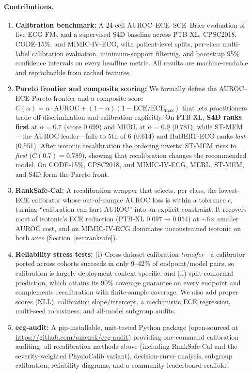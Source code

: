 \paragraph{Contributions.}
\begin{enumerate}
  \item \textbf{Calibration benchmark:} A 24-cell AUROC--ECE--SCE--Brier evaluation of five
    ECG FMs and a supervised S4D baseline across PTB-XL, CPSC2018, CODE-15\%, and
    MIMIC-IV-ECG, with patient-level splits, per-class multi-label calibration evaluation,
    minimum-support filtering, and bootstrap 95\% confidence intervals on every headline
    metric. All results are machine-readable and reproducible from cached features.

  \item \textbf{Pareto frontier and composite scoring:} We formally define the AUROC--ECE
    Pareto frontier and a composite score $C(\alpha) = \alpha \cdot \text{AUROC}
    + (1-\alpha)(1 - \text{ECE}/\text{ECE}_{\max})$ that lets practitioners trade off
    discrimination and calibration explicitly. On PTB-XL, \textbf{S4D ranks first} at
    $\alpha=0.7$ (score 0.699) and MERL at $\alpha=0.9$ (0.781), while ST-MEM---the AUROC
    leader---falls to 5th of 6 (0.614) and HuBERT-ECG ranks \emph{last} (0.551). After
    isotonic recalibration the ordering inverts: ST-MEM rises to \emph{first} ($C(0.7)=0.789$),
    showing that recalibration changes the recommended model. On CODE-15\%, CPSC2018, and
    MIMIC-IV-ECG, MERL, ST-MEM, and S4D form the Pareto front.

  \item \textbf{RankSafe-Cal:} A recalibration wrapper that selects, per class, the
    lowest-ECE calibrator whose out-of-sample AUROC loss is within a tolerance $\epsilon$,
    turning ``calibration can hurt AUROC'' into an explicit constraint. It recovers most of
    isotonic's ECE reduction (PTB-XL $0.097\!\to\!0.054$) at $\sim$6$\times$ smaller AUROC cost,
    and on MIMIC-IV-ECG dominates unconstrained isotonic on both axes
    (Section~\ref{sec:ranksafe}).

  \item \textbf{Reliability stress tests:} (i) Cross-dataset calibration \emph{transfer}---a
    calibrator ported across cohorts succeeds in only 9--42\% of endpoint/model pairs, so
    calibration is largely deployment-context-specific; and (ii) split-conformal prediction,
    which attains its $90\%$ coverage guarantee on every endpoint and complements recalibration
    with finite-sample coverage. We also add proper scores (NLL), calibration slope/intercept,
    a mechanistic ECE regression, multi-seed robustness, and all-model subgroup audits.

  \item \textbf{ecg-audit:} A pip-installable, unit-tested Python package (open-sourced at
    \url{https://github.com/amensk/ecg-audit}) providing one-command calibration auditing,
    all recalibration methods above (including RankSafe-Cal and the severity-weighted
    PhysioCalib variant), decision-curve analysis, subgroup calibration, reliability diagrams,
    and a community leaderboard scaffold.
\end{enumerate}

